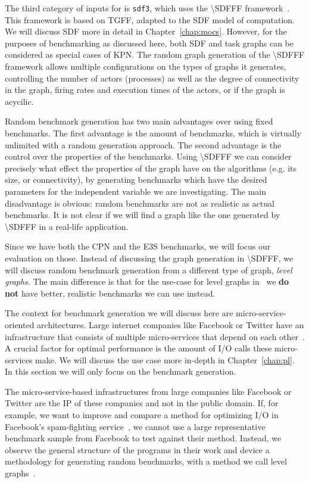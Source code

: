 The third category of inputs for \mocasin is \texttt{sdf3}, which uses the \ac{\SDFFF} framework~\cite{sdf3}.
This framework is based on \ac{TGFF}, adapted to the \ac{SDF} model of computation.
We will discuss \ac{SDF} more in detail in Chapter~\ref{chap:mocs}.
However, for the purposes of benchmarking as discussed here, both \ac{SDF} and task graphs can be considered as special cases of \ac{KPN}.
The random graph generation of the \ac{\SDFFF} framework allows multiple configurations on the types of graphs it generates, controlling the number of actors (processes) as well as the degree of connectivity in the graph, firing rates and execution times of the actors, or if the graph is acycilic.

Random benchmark generation has two main advantages over using fixed benchmarks. The first advantage is the amount of benchmarks, which is virtually unlimited with a random generation approach.
The second advantage is the control over the properties of the benchmarks.
Using \ac{\SDFFF} we can consider precisely what effect the properties of the graph have on the algorithms (e.g. its size, or connectivity), by generating benchmarks which have the desired parameters for the independent variable we are investigating.
The main disadvantage is obvious: random benchmarks are not as realistic as actual benchmarks.
It is not clear if we will find a graph like the one generated by \ac{\SDFFF} in a real-life application.

Since we have both the \ac{CPN} and the \ac{E3S} benchmarks, we will focus our evaluation on those.
Instead of discussing the graph generation in \ac{\SDFFF}, we will discuss random benchmark generation from a different type of graph, \emph{level graphs}\cite{goens_multiprog18}.
The main difference is that for the use-case for level graphs in~\cite{goens_multiprog18} we \textbf{do not} have better, realistic benchmarks we can use instead.

The context for benchmark generation we will discuss here are micro-service-oriented architectures.
Large internet companies like Facebook or Twitter have an infrastructure that consists of multiple micro-services that depend on each other~\cite{marlow2014haxl}.
A crucial factor for optimal performance is the amount of \ac{I/O} calls these micro-services make.
We will discuss the use case more in-depth in Chapter~\ref{chap:pl}. 
In this section we will only focus on the benchmark generation.

The micro-service-based infrastructures from large companies like Facebook or Twitter are the \acf{IP} of these companies and not in the public domain.
If, for example, we want to improve and compare a method for optimizing \ac{I/O} in Facebook's spam-fighting service~\cite{marlow2014haxl}, we cannot use a large representative benchmark sample from Facebook to test against their method.
Instead, we observe the general structure of the programs in their work and device a methodology for generating random benchmarks, with a method we call level graphs~\cite{goens_multiprog18}.

